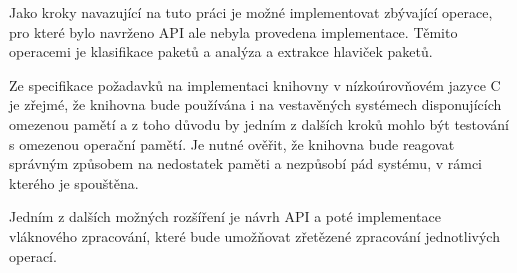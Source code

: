 Jako kroky navazující na tuto práci je možné implementovat zbývající operace, pro které bylo navrženo API ale nebyla provedena implementace. Těmito operacemi je klasifikace paketů a analýza a extrakce hlaviček paketů.

Ze specifikace požadavků na implementaci knihovny v nízkoúrovňovém jazyce C je zřejmé,
že knihovna bude používána i na vestavěných systémech disponujících omezenou pamětí a z toho
důvodu by jedním z dalších kroků mohlo být testování s omezenou operační pamětí.
Je nutné ověřit, že knihovna bude reagovat správným způsobem na nedostatek paměti a nezpůsobí pád systému,
v rámci kterého je spouštěna.

Jedním z dalších možných rozšíření je návrh API a poté implementace vláknového zpracování, které bude
umožňovat zřetězené zpracování jednotlivých operací.
